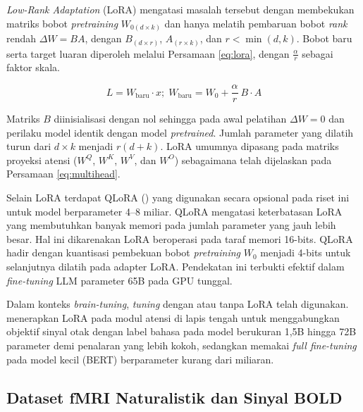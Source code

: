 \textit{Low-Rank Adaptation} (LoRA) \autocite{hu2022lora} mengatasi masalah tersebut dengan membekukan matriks bobot \textit{pretraining} $W_{0 (d \times k)}$ dan hanya melatih pembaruan bobot \textit{rank} rendah $\Delta W = BA$, dengan $B_{(d \times r)}$, $A_{(r \times k)}$, dan $r < \min(d,k)$. Bobot baru serta target luaran diperoleh melalui Persamaan \ref{eq:lora}, dengan $\frac{\alpha}{r}$ sebagai faktor skala.
 
\begin{equation}
  L = W_{\text{baru}} \cdot x ;\; W_{\text{baru}} = W_0 + \frac{\alpha}{r}\ B \cdot A
  \label{eq:lora}
\end{equation}
 
Matriks $B$ diinisialisasi dengan nol sehingga pada awal pelatihan $\Delta W = 0$ dan perilaku model identik dengan model \textit{pretrained}. Jumlah parameter yang dilatih  turun dari $d \times k$ menjadi $r(d+k)$. LoRA umumnya dipasang pada matriks proyeksi atensi ($W^Q$, $W^K$, $W^V$, dan $W^O$) sebagaimana telah dijelaskan pada Persamaan \ref{eq:multihead}.

Selain LoRA terdapat QLoRA () \autocite{dettmers2023qloraefficientfinetuningquantized} yang digunakan secara opsional pada riset ini untuk model berparameter 4--8 miliar. QLoRA mengatasi keterbatasan LoRA yang membutuhkan banyak memori pada jumlah parameter yang jauh lebih besar. Hal ini dikarenakan LoRA beroperasi pada taraf memori 16-bits. QLoRA hadir dengan kuantisasi pembekuan bobot \textit{pretraining} $W_{0}$ menjadi 4-bits untuk selanjutnya dilatih pada adapter LoRA. Pendekatan ini terbukti efektif dalam \textit{fine-tuning} LLM parameter 65B pada GPU tunggal.

Dalam konteks \textit{brain-tuning}, \textit{tuning} dengan atau tanpa LoRA telah digunakan. \textcite{xiao2026beyond} menerapkan LoRA pada modul atensi di lapis tengah untuk menggabungkan objektif sinyal otak dengan label bahasa pada model berukuran 1,5B hingga 72B parameter demi penalaran yang lebih kokoh, sedangkan \textcite{negi2025brain} memakai \textit{full fine-tuning} pada model kecil (BERT) berparameter kurang dari miliaran. %
 
 
\subsection{Dataset fMRI Naturalistik dan Sinyal BOLD}
\label{sub:sl_fmri}
 
